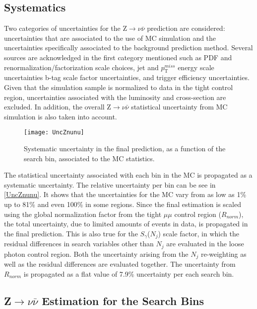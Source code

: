 \subsection{Systematics}\label{systematics}

Two categories of uncertainties for the Z$\rightarrow\nu\bar{\nu}$ prediction are considered: uncertainties that are associated to the use of MC simulation and the uncertainties specifically associated to the background prediction method. Several sources are acknowledged in the first category mentioned such as PDF and renormalization/factorization scale choices, jet and $p_\text{T}^{miss}$ energy scale uncertainties b-tag scale factor uncertainties, and trigger efficiency uncertainties. Given that the simulation sample is normalized to data in the tight control region, uncertainties associated with the luminosity and cross-section are excluded. In addition, the overall Z$\rightarrow\nu\bar{\nu}$ statistical uncertainty from MC simulation is also taken into account.\\

\begin{figure}[H]
\begin{center}
\texttt{[image: UncZnunu]}
\end{center}
\vspace{-1em}
\caption{Systematic uncertainty in the final prediction, as a function of the search bin, associated to the MC statistics.}
\label{UncZnunu}
\end{figure}

The statistical uncertainty associated with each bin in the MC is propagated as a systematic uncertainty. The relative uncertainty per bin can be see in \autoref{UncZnunu}. It shows that the uncertainties for the MC vary from as low as 1\% up to 81\% and even 100\% in some regions. Since the final estimation is scaled using the global normalization factor from the tight $\mu\mu$ control region ($R_{norm}$), the total uncertainty, due to limited amounts of events in data, is propagated in the final prediction. This is also true for the $S_\gamma$($N_j$) scale factor, in which the residual differences in search variables other than $N_j$ are evaluated in the loose photon control region. Both the uncertainty arising from the $N_j$ re-weighting as well as the residual differences are evaluated together. The uncertainty from $R_{norm}$ is propagated as a flat value of 7.9\% uncertainty per each search bin.

\subsection{Z$\rightarrow\nu\bar{\nu}$ Estimation for the Search Bins}

